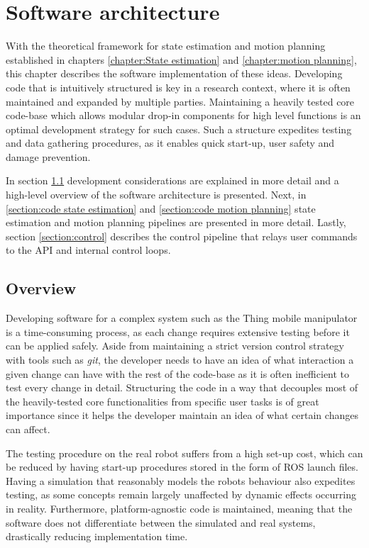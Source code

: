 \documentclass[times, utf8, diplomski, english]{fer}
\begin{document}
\chapter{Software architecture}
With the theoretical framework for state estimation and motion planning established in chapters \ref{chapter:State estimation} and \ref{chapter:motion planning}, this chapter describes the software implementation of these ideas.
Developing code that is intuitively structured is key in a research context, where it is often maintained and expanded by multiple parties.
Maintaining a heavily tested core code-base which allows modular drop-in components for high level functions is an optimal development strategy for such cases.
Such a structure expedites testing and data gathering procedures, as it enables quick start-up, user safety and damage prevention.

In section \ref{section:overview} development considerations are explained in more detail and a high-level overview of the software architecture is presented.
Next, in \ref{section:code state estimation} and \ref{section:code motion planning} state estimation and motion planning pipelines are presented in more detail.%
Lastly, section \ref{section:control} describes the control pipeline that relays user commands to the API and internal control loops. %

\section{Overview}\label{section:overview}
Developing software for a complex system such as the Thing mobile manipulator is a time-consuming process, as each change requires extensive testing before it can be applied safely.
Aside from maintaining a strict version control strategy with tools such as \textit{git}, the developer needs to have an idea of what interaction a given change can have with the rest of the code-base as it is often inefficient to test every change in detail.
Structuring the code in a way that decouples most of the heavily-tested core functionalities from specific user tasks is of great importance since it helps the developer maintain an idea of what certain changes can affect.

The testing procedure on the real robot suffers from a high set-up cost, which can be reduced by having start-up procedures stored in the form of ROS launch files.
Having a simulation that reasonably models the robots behaviour also expedites testing, as some concepts remain largely unaffected by dynamic effects occurring in reality.
Furthermore, platform-agnostic code is maintained, meaning that the software does not differentiate between the simulated and real systems, drastically reducing implementation time.
\end{document}
